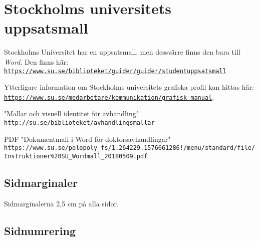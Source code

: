 
\section{Stockholms universitets uppsatsmall}
\label{utseende}

Stockholms Universitet har en uppsatsmall, men dessvärre finns den bara till
\textit{Word}. Den finns här: \texttt{\href{https://www.su.se/biblioteket/guider/guider/studentuppsatsmall}{https://\linebreak[0]{}www.su.se/\linebreak[0]{}biblioteket/\linebreak[0]{}guider/\linebreak[0]{}guider/\linebreak[0]{}studentuppsatsmall}}

Ytterligare information om Stockholms universitets grafiska profil kan hittas här:
\texttt{\href{https://www.su.se/medarbetare/kommunikation/grafisk-manual}{https://\linebreak[0]{}www.su.se/medarbetare/\linebreak[0]{}kommunikation/\linebreak[0]{}grafisk-manual}}.

"Mallar och visuell identitet för avhandling"
\verb|http://su.se/biblioteket/avhandlingsmallar|


PDF "Dokumentmall i Word för doktorsavhandlingar"
\verb|https://www.su.se/polopoly_fs/1.264229.1576661286!/menu/standard/file/Instruktioner%20SU_Wordmall_20180509.pdf|


\subsection{Sidmarginaler}

Sidmarginalerna 2,5 cm på alla sidor.


\subsection{Sidnumrering}




